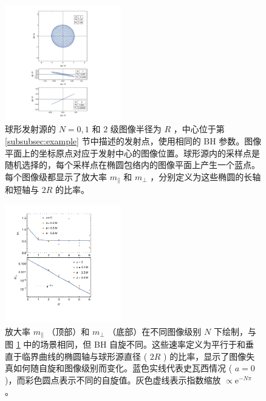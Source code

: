 \documentclass[aps,reprint,superscriptaddress,nofootinbib,floatfix,longbibliography,preprintnumbers]{revtex4-1}
\newcommand{\ee}{\mathrm{e}}
\begin{document}
   \begin{figure}[t]
    \centering
    \includegraphics[width=0.45\textwidth]{figures/shapes.pdf}
    \caption{球形发射源的    $N=0, 1$    和    $2$    级图像半径为    $R$    ，中心位于第    \ref{subsubsec:example}    节中描述的发射点，使用相同的 BH 参数。图像平面上的坐标原点对应于发射中心的图像位置。球形源内的采样点是随机选择的，每个采样点在椭圆包络内的图像平面上产生一个蓝点。每个图像级都显示了放大率    $m_{\parallel}$    和    $m_{\perp}$    ，分别定义为这些椭圆的长轴和短轴与    $2R$    的比率。  } 
    \label{fig:shape}
\end{figure}     

   \begin{figure}
    \centering
    \includegraphics[width=0.45\textwidth]{figures/mags_vs_N.pdf}
    \caption{放大率    $m_{\parallel}$   （顶部）和    $m_{\perp}$   （底部）在不同图像级别    $N$    下绘制，与图    \ref{fig:shape}    中的场景相同，但 BH 自旋不同。这些速率定义为平行于和垂直于临界曲线的椭圆轴与球形源直径 (   $2R$   ) 的比率，显示了图像失真如何随自旋和图像级别而变化。蓝色实线代表史瓦西情况 (   $a=0$   )，而彩色圆点表示不同的自旋值。灰色虚线表示指数缩放    $\propto \ee^{-N\pi}$   。  }
    \label{fig:mag vs. N}
\end{figure}     
\end{document}
